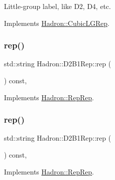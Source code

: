 Little-\/group label, like D2, D4, etc. 

Implements \mbox{\hyperlink{structHadron_1_1CubicLGRep_a9bdb14b519a611d21379ed96a3a9eb41}{Hadron\+::\+Cubic\+L\+G\+Rep}}.

\mbox{\label{structHadron_1_1D2B1Rep_a7ff8b1fc65d3414195a7788bc220b1c0}} 
\subsubsection{\texorpdfstring{rep()}{rep()}\hspace{0.1cm}{\footnotesize\ttfamily [1/5]}}
{\footnotesize\ttfamily std\+::string Hadron\+::\+D2\+B1\+Rep\+::rep (\begin{DoxyParamCaption}{ }\end{DoxyParamCaption}) const\hspace{0.3cm}{\ttfamily [inline]}, {\ttfamily [virtual]}}



Implements \mbox{\hyperlink{structHadron_1_1RepRep_ab3213025f6de249f7095892109575fde}{Hadron\+::\+Rep\+Rep}}.

\mbox{\label{structHadron_1_1D2B1Rep_a7ff8b1fc65d3414195a7788bc220b1c0}} 
\subsubsection{\texorpdfstring{rep()}{rep()}\hspace{0.1cm}{\footnotesize\ttfamily [2/5]}}
{\footnotesize\ttfamily std\+::string Hadron\+::\+D2\+B1\+Rep\+::rep (\begin{DoxyParamCaption}{ }\end{DoxyParamCaption}) const\hspace{0.3cm}{\ttfamily [inline]}, {\ttfamily [virtual]}}



Implements \mbox{\hyperlink{structHadron_1_1RepRep_ab3213025f6de249f7095892109575fde}{Hadron\+::\+Rep\+Rep}}.

\mbox{\label{structHadron_1_1D2B1Rep_a7ff8b1fc65d3414195a7788bc220b1c0}} 
